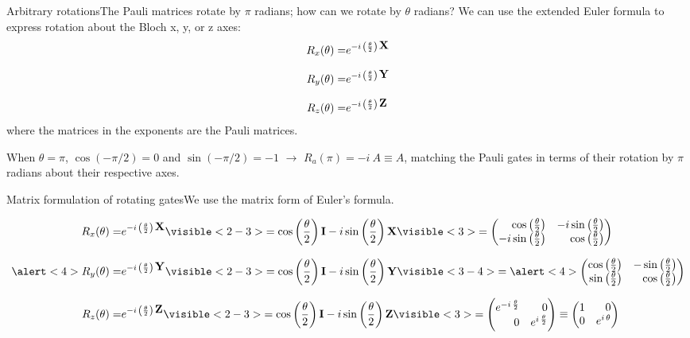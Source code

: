 \begin{frame}{Arbitrary rotations}{The Pauli matrices rotate by $\pi$ radians;  how can we rotate by $\theta$ radians?}
We can use the extended Euler formula to express rotation about the Bloch x, y, or z axes:
\begin{align*}
R_{x}(\theta) = & e^{-i\,\left(\frac{\theta}{2}\right)\,\mbox{\bfseries{\textrm{X}}}{}}\\[0.7em]
R_{y}(\theta) = & e^{-i\,\left(\frac{\theta}{2}\right)\,\mbox{\bfseries{\textrm{Y}}}{}}\\[0.7em]
R_{z}(\theta) = & e^{-i\,\left(\frac{\theta}{2}\right)\,\mbox{\bfseries{\textrm{Z}}}{}}
\end{align*}
where the matrices in the exponents are the Pauli matrices.

When $\theta=\pi$, $\cos(-\pi/2)=0$ and $\sin(-\pi/2)=-1$ $\rightarrow$ $R_a(\pi) = -i\ A \equiv A$, matching the Pauli gates in terms of their rotation by $\pi$ radians about their respective axes.
\end{frame}

\def\EulerP#1{%
\ComplexDiff{\cos\left(\frac{\theta}{2}\right)\Identity}{\sin\left(\frac{\theta}{2}\right)#1}}

\begin{frame}{Matrix formulation of rotating gates}{We use the matrix form of Euler's formula.}

\begin{align*}
R_{x}(\theta) = & \ExpNegPhase{\left(\frac{\theta}{2}\right)\,\PauliX{}}%
\visible<2-3>{= \EulerP{\PauliX{}}}%
\visible<3>{= \SQBG{\relax}{\cos\left(\frac{\theta}{2}\right)}{\ImaginaryM{\sin\left(\frac{\theta}{2}\right)}}{\ImaginaryM{\sin\left(\frac{\theta}{2}\right)}}{\cos\left(\frac{\theta}{2}\right)}}\\[0.7em]
%
%
\alert<4>{R_{y}(\theta)} = & \ExpNegPhase{\left(\frac{\theta}{2}\right)\,\PauliY{}}%
\visible<2-3>{= \EulerP{\PauliY{}}}
\visible<3-4>{= \alert<4>{\SQBG{\relax}{\cos\left(\frac{\theta}{2}\right)}{-\sin\left(\frac{\theta}{2}\right)}{\sin\left(\frac{\theta}{2}\right)}{\cos\left(\frac{\theta}{2}\right)}}}\\[0.7em]
%
%
R_{z}(\theta) = & \ExpNegPhase{\left(\frac{\theta}{2}\right)\,\PauliZ{}}%
\visible<2-3>{= \EulerP{\PauliZ{}}}%
\visible<3>{= \SQBG{\relax}{\ExpNegPhase{\frac{\theta}{2}}}{0}{0}{\ExpPhase{\frac{\theta}{2}}}
\equiv \SQBG{\relax}{1}{0}{0}{\ExpPhase{\theta}}}
\end{align*}
\end{frame}

